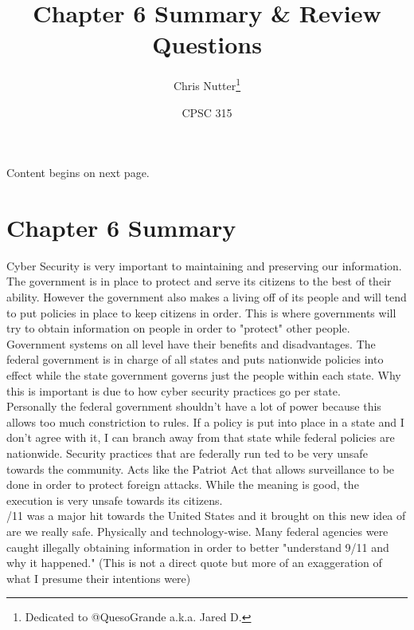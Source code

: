 \documentclass[12pt]{article}
\title{Chapter 6 Summary \& Review Questions}
\author{Chris Nutter\thanks{Dedicated to @QuesoGrande a.k.a. Jared D.}}
\date{CPSC 315}
\begin{document}
\maketitle

\normalsize

\tableofcontents    
\vspace{4ex}

\begin{center} Content begins on next page. \end{center}

\newpage
\doublespacing

\section{Chapter 6 Summary}
    \indent Cyber Security is very important to maintaining and preserving our information. The government is in place to protect and serve its citizens to the best of their ability. However the government also makes a living off of its people and will tend to put policies in place to keep citizens in order. This is where governments will try to obtain information on people in order to "protect" other people. Government systems on all level have their benefits and disadvantages. The federal government is in charge of all states and puts nationwide policies into effect while the state government governs just the people within each state. Why this is important is due to how cyber security practices go per state.\\
    \indent Personally the federal government shouldn't have a lot of power because this allows too much constriction to rules. If a policy is put into place in a state and I don't agree with it, I can branch away from that state while federal policies are nationwide. Security practices that are federally run ted to be very unsafe towards the community. Acts like the Patriot Act that allows surveillance to be done in order to protect foreign attacks. While the meaning is good, the execution is very unsafe towards its citizens.\\
    /11 was a major hit towards the United States and it brought on this new idea of are we really safe. Physically and technology-wise. Many federal agencies were caught illegally obtaining information in order to better "understand 9/11 and why it happened." (This is not a direct quote but more of an exaggeration of what I presume their intentions were)
\newpage
\onehalfspacing
\end{document}
